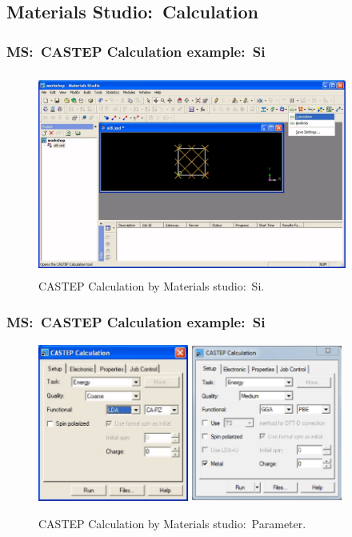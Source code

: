 \subsection{\rm{Materials Studio:~Calculation}}
\frame
{
	\frametitle{\textrm{MS:~CASTEP Calculation example:~Si}}
\begin{figure}[h!]
\centering
\vspace*{-0.10in}
\includegraphics[height=2.62in,width=4.00in,viewport=0 0 1210 740,clip]{Figures/MS-CASTEP-01-Si.png}
\caption{\tiny \textrm{CASTEP Calculation by Materials studio:~Si.}}%
\label{MS-CASTEP-Calculation-01}
\end{figure}
}

\frame
{
	\frametitle{\textrm{MS:~CASTEP Calculation example:~Si}}
\begin{figure}[h!]
\centering
\includegraphics[height=2.05in,width=1.95in,viewport=0 0 756 787,clip]{Figures/MS-CASTEP-02-Si-parameter-1.png}
\includegraphics[height=2.05in,width=1.95in,viewport=0 0 775 798,clip]{Figures/MS-CASTEP-02-Si-parameter-2.png}
\caption{\tiny \textrm{CASTEP Calculation by Materials studio:~Parameter.}}%
\label{MS-CASTEP-Calculation-02}
\end{figure}
}

